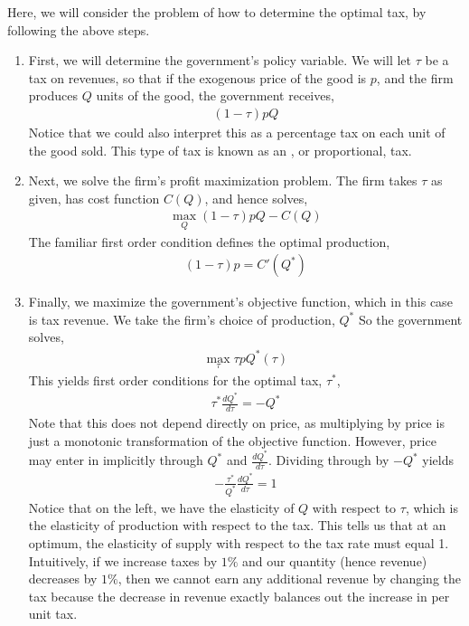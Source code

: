 Here, we will consider the problem of how to determine the optimal tax, by following the above steps.

\begin{enumerate}
    \item First, we will determine the government's policy variable. We will let $\tau$ be a tax on revenues, so that if the exogenous price of the good is $p$, and the firm produces $Q$ units of the good, the government receives,
    \begin{align*}
        (1 - \tau) p Q
    \end{align*}
    Notice that we could also interpret this as a percentage tax on each unit of the good sold. This type of tax is known as an , or proportional, tax. 
    \item Next, we solve the firm's profit maximization problem. The firm takes $\tau$ as given, has cost function $C(Q)$, and hence solves,
    \begin{align*}
        \max_{Q} (1 - \tau) p Q - C(Q)
    \end{align*}
    The familiar first order condition defines the optimal production,
    \begin{align*}
        (1 - \tau) p = C'(Q^*)
    \end{align*}
    \item Finally, we maximize the government's objective function, which in this case is tax revenue. We take the firm's choice of production, $Q^*$ So the government solves,
    \begin{align*}
        \max_{\tau} \tau p Q^*(\tau)
    \end{align*}
    This yields first order conditions for the optimal tax, $\tau^*$, 
    \begin{align*}
        \tau^* \frac{dQ^*}{d\tau} = -Q^*
    \end{align*}
    Note that this does not depend directly on price, as multiplying by price is just a monotonic transformation of the objective function. However, price may enter in implicitly through $Q^*$ and $\frac{dQ^*}{d\tau}$. Dividing through by $-Q^*$ yields
    \begin{align*}
        -\frac{\tau^*}{Q^*} \frac{dQ^*}{d\tau} = 1
    \end{align*}
    Notice that on the left, we have the elasticity of $Q$ with respect to $\tau$, which is the elasticity of production with respect to the tax. This tells us that at an optimum, the elasticity of supply with respect to the tax rate must equal 1. Intuitively, if we increase taxes by $1\%$ and our quantity (hence revenue) decreases by $1\%$, then we cannot earn any additional revenue by changing the tax because the decrease in revenue exactly balances out the increase in per unit tax. 
\end{enumerate}

